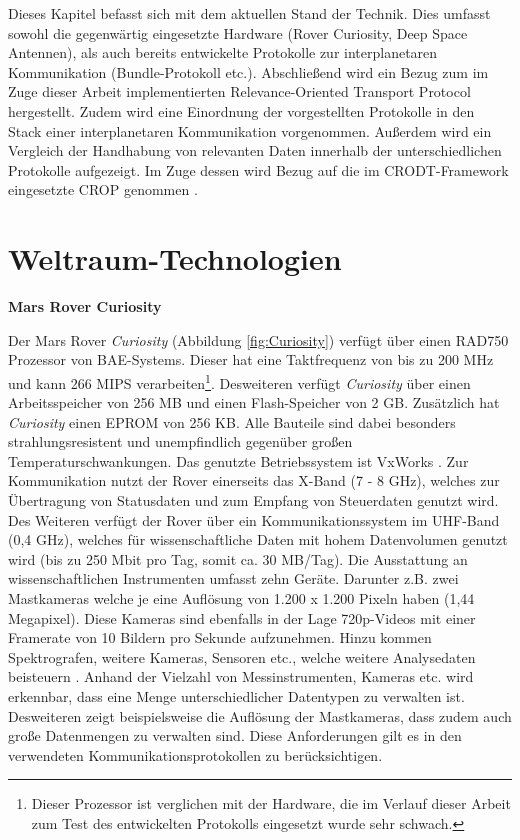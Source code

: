\label{cap:standDerTechnik}
Dieses Kapitel befasst sich mit dem aktuellen Stand der Technik. Dies
umfasst sowohl die gegenw{\"a}rtig eingesetzte Hardware (Rover Curiosity, Deep
Space Antennen), als auch bereits entwickelte Protokolle zur interplanetaren
Kommunikation (Bundle-Protokoll etc.). Abschlie{\ss}end wird ein Bezug zum im
Zuge dieser Arbeit implementierten Relevance-Oriented Transport Protocol
hergestellt. Zudem wird eine Einordnung der vorgestellten Protokolle in
den Stack einer interplanetaren Kommunikation vorgenommen. Au{\ss}erdem wird ein
Vergleich der Handhabung von relevanten Daten innerhalb der unterschiedlichen
Protokolle aufgezeigt. Im Zuge dessen wird Bezug auf die im \gls{CRODT}-Framework
eingesetzte \gls{CROP} genommen \cite{Daher}.

\section{Weltraum-Technologien}

\textbf{Mars Rover Curiosity} \newline

Der Mars Rover \textit{Curiosity} (Abbildung \ref{fig:Curiosity}) verf{\"u}gt
{\"u}ber einen RAD750 Prozessor von BAE-Systems.
Dieser hat eine Taktfrequenz von bis zu 200 MHz und kann 266 MIPS
verarbeiten\footnote{Dieser Prozessor ist verglichen mit der Hardware, die im
Verlauf dieser Arbeit zum Test des entwickelten Protokolls eingesetzt wurde
sehr schwach.}. Desweiteren verf{\"u}gt \textit{Curiosity} {\"u}ber einen
Arbeitsspeicher von 256 MB und einen Flash-Speicher von 2 GB. Zus{\"a}tzlich
hat \textit{Curiosity} einen EPROM von 256 KB. Alle Bauteile sind dabei
besonders strahlungsresistent und unempfindlich gegen{\"u}ber gro{\ss}en
Temperaturschwankungen. Das genutzte Betriebssystem ist VxWorks \cite{WR}.
Zur Kommunikation nutzt der Rover einerseits das X-Band (7 - 8 GHz), welches zur
{\"U}bertragung von Statusdaten und zum Empfang von Steuerdaten genutzt wird.
Des Weiteren verf{\"u}gt der Rover {\"u}ber ein Kommunikationssystem im UHF-Band
(0,4 GHz), welches f{\"u}r wissenschaftliche Daten mit hohem Datenvolumen
genutzt wird (bis zu 250 Mbit pro Tag, somit ca. 30 MB/Tag).\newline 
Die Ausstattung an wissenschaftlichen Instrumenten umfasst zehn Ger{\"a}te.
Darunter z.B. zwei Mastkameras welche je eine Aufl{\"o}sung von 1.200 x 1.200
Pixeln haben (1,44 Megapixel). Diese Kameras sind ebenfalls in der Lage
720p-Videos mit einer Framerate von 10 Bildern pro Sekunde aufzunehmen. Hinzu
kommen Spektrografen, weitere Kameras, Sensoren etc., welche weitere
Analysedaten beisteuern \cite{web5}. Anhand der Vielzahl von Messinstrumenten,
Kameras etc. wird erkennbar, dass eine Menge unterschiedlicher Datentypen zu
verwalten ist.
Desweiteren zeigt beispielsweise die Aufl{\"o}sung der Mastkameras, dass zudem
auch gro{\ss}e Datenmengen zu verwalten sind. Diese Anforderungen gilt es in den
verwendeten Kommunikationsprotokollen zu ber{\"u}cksichtigen.

